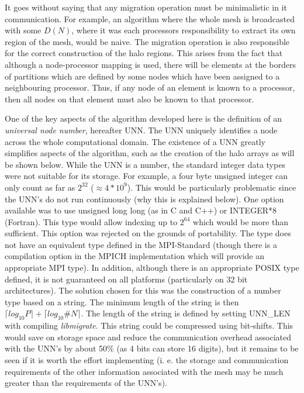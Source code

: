 \documentclass[11pt]{article}
\begin{document}
It goes without saying that any migration operation must be
minimalistic in it communication. For example, an algorithm where the
whole mesh is broadcasted with some $D(N)$, where it was each
processors responsibility to extract its own region of the mesh, would
be naive. The migration operation is also responsible for the correct
construction of the halo regions. This arises from the fact that
although a node-processor mapping is used, there will be elements at
the borders of partitions which are defined by some nodes which have
been assigned to a neighbouring processor. Thus, if any node of an
element is known to a processor, then all nodes on that element must
also be known to that processor.

One of the key aspects of the algorithm developed here is the
definition of an {\it universal node number}, hereafter UNN. The UNN
uniquely identifies a node across the whole computational domain. The
existence of a UNN greatly simplifies aspects of the algorithm, such
as the creation of the halo arrays as will be shown below. While the
UNN is a number, the standard integer data types were not suitable for
its storage. For example, a four byte unsigned integer can only count
as far as $2^{32}$ ($\approx 4*10^9$). This would be particularly
problematic since the UNN's do not run continuously (why this is
explained below). One option available was to use unsigned long long
(as in C and C++) or INTEGER*8 (Fortran). This type would allow
indexing up to $2^{64}$ which would be more than sufficient. This
option was rejected on the grounds of portability. The type does not
have an equivalent type defined in the MPI-Standard (though there is a
compilation option in the MPICH implementation which will provide an
appropriate MPI type). In addition, although there is an appropriate
POSIX type defined, it is not guaranteed on all platforms
(particularly on 32 bit architectures). The solution chosen for this
was the construction of a number type based on a string. The minimum
length of the string is then $\lceil log_{10}P \rceil + \lceil
log_{10}\#N \rceil$. The length of the string is defined by setting
UNN\_LEN with compiling {\it libmigrate}. This string could be
compressed using bit-shifts. This would save on storage space and
reduce the communication overhead associated with the UNN's by about
50\% (as 4 bits can store 16 digits), but it remains to be seen if it
is worth the effort implementing (i. e. the storage and communication
requirements of the other information associated with the mesh may be
much greater than the requirements of the UNN's).
\end{document}
